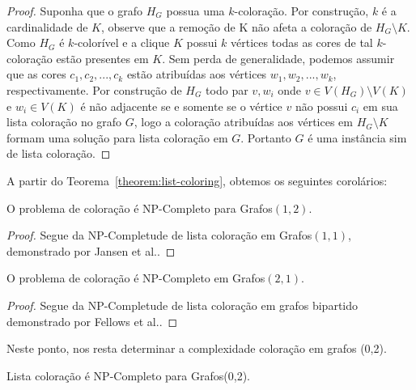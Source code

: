 \begin{proof}
Suponha que o grafo $H_G$ possua uma $k$-coloração. Por construção, $k$ é a cardinalidade de $K$, observe que a remoção de K não afeta a coloração de $H_G \setminus K$.
Como $H_G$ é $k$-colorível e a clique $K$ possui $k$ vértices todas as cores de tal $k$-coloração estão presentes em $K$. Sem perda de generalidade, podemos assumir que as cores $c_1,c_2,...,c_k$ estão atribuídas aos vértices $w_1,w_2,...,w_k$, respectivamente.
Por construção de $H_G$ todo par $v,w_i$ onde $v \in V(H_G) \setminus V(K)$ e $w_i \in V(K)$ é não adjacente se e somente se o vértice $v$ não possui $c_i$ em sua lista coloração no grafo $G$, logo a coloração atribuídas aos vértices em $H_G \setminus K$ formam uma solução para lista coloração em $G$. Portanto $G$ é uma instância sim de lista coloração.
\end{proof}


A partir do Teorema~\ref{theorem:list-coloring}, obtemos os seguintes corolários:

\begin{corolario}
O problema de coloração é NP-Completo para Grafos$(1,2)$.
\end{corolario}

\begin{proof}
Segue da NP-Completude de lista coloração em Grafos$(1,1)$, demonstrado por Jansen et al.\cite{jansen1997}.
\end{proof}

	
\begin{corolario}
O problema de coloração é NP-Completo em Grafos$(2,1)$.
\end{corolario}    

\begin{proof}
Segue da NP-Completude de lista coloração em grafos bipartido demonstrado por Fellows et al.\cite{fellows07}.
\end{proof}

Neste ponto, nos resta determinar a complexidade coloração em grafos (0,2).


\begin{teorema} \label{teorema:lista-2}
Lista coloração é NP-Completo para Grafos(0,2).
\end{teorema}

